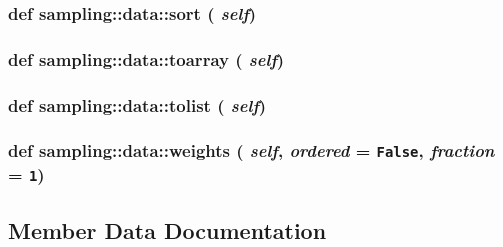 \hypertarget{classsampling_1_1data_55bd6270b85c5a80aa4a74b0fd2b44cb}{
\subsubsection[{sort}]{\setlength{\rightskip}{0pt plus 5cm}def sampling::data::sort ( {\em self})}}
\label{classsampling_1_1data_55bd6270b85c5a80aa4a74b0fd2b44cb}


\hypertarget{classsampling_1_1data_7e4d9b676ac16687825f8698511904e4}{
\subsubsection[{toarray}]{\setlength{\rightskip}{0pt plus 5cm}def sampling::data::toarray ( {\em self})}}
\label{classsampling_1_1data_7e4d9b676ac16687825f8698511904e4}


\hypertarget{classsampling_1_1data_ca31acb9a3f5ac73c6b578560f1d85c3}{
\subsubsection[{tolist}]{\setlength{\rightskip}{0pt plus 5cm}def sampling::data::tolist ( {\em self})}}
\label{classsampling_1_1data_ca31acb9a3f5ac73c6b578560f1d85c3}


\hypertarget{classsampling_1_1data_e59799438bbe2136d082d67e95a84afd}{
\subsubsection[{weights}]{\setlength{\rightskip}{0pt plus 5cm}def sampling::data::weights ( {\em self}, \/   {\em ordered} = {\tt False}, \/   {\em fraction} = {\tt 1})}}
\label{classsampling_1_1data_e59799438bbe2136d082d67e95a84afd}




\subsection{Member Data Documentation}
\hypertarget{classsampling_1_1data_160aaf82abdd3a24d5a830dc1b0ed378}{
\subsubsection[{dataset}]{}}
\label{classsampling_1_1data_160aaf82abdd3a24d5a830dc1b0ed378}


